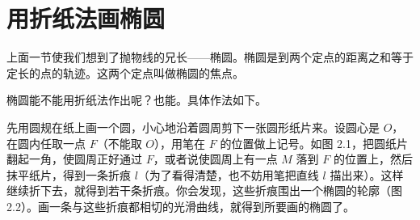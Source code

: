 \section{用折纸法画椭圆}

上面一节使我们想到了抛物线的兄长——椭圆。椭圆是到两个定点的距离之和等于定长的点的轨迹。这两个定点叫做椭圆的焦点。

椭圆能不能用折纸法作出呢？也能。具体作法如下。

先用圆规在纸上画一个圆，小心地沿着圆周剪下一张圆形纸片来。设圆心是 $O$，在圆内任取一点 $F$（不能取 $O$），用笔在 $F$ 的位置做上记号。如图 2.1，把圆纸片翻起一角，使圆周正好通过 $F$，或者说使圆周上有一点 $M$ 落到 $F$ 的位置上，然后抹平纸片，得到一条折痕 $l$（为了看得清楚，也不妨用笔把直线 $l$ 描出来）。这样继续折下去，就得到若干条折痕。你会发现，这些折痕围出一个椭圆的轮廓（图 2.2）。画一条与这些折痕都相切的光滑曲线，就得到所要画的椭圆了。

